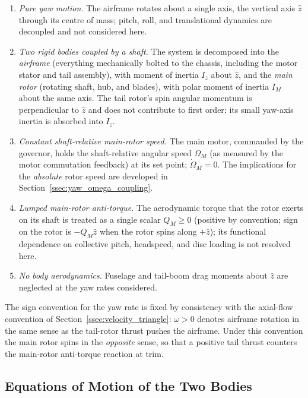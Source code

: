 \documentclass[11pt,a4paper]{article}
\begin{document}
\begin{enumerate}[leftmargin=*,itemsep=2pt,topsep=2pt]
\item \emph{Pure yaw motion.} The airframe rotates about a single
      axis, the vertical axis \(\hat z\) through its centre of mass;
      pitch, roll, and translational dynamics are decoupled and not
      considered here.
\item \emph{Two rigid bodies coupled by a shaft.} The system is
      decomposed into the \emph{airframe} (everything mechanically
      bolted to the chassis, including the motor stator and tail
      assembly), with moment of inertia \(I_z\) about \(\hat z\),
      and the \emph{main rotor} (rotating shaft, hub, and blades),
      with polar moment of inertia \(I_M\) about the same axis.
      The tail rotor's spin angular momentum is perpendicular to
      \(\hat z\) and does not contribute to first order; its small
      yaw-axis inertia is absorbed into \(I_z\).
\item \emph{Constant shaft-relative main-rotor speed.} The
      main motor, commanded by the governor, holds the
      shaft-relative angular speed \(\Omega_M\) (as measured by the
      motor commutation feedback) at its set point;
      \(\dot\Omega_M=0\). The implications for the \emph{absolute}
      rotor speed are developed in
      Section~\ref{ssec:yaw_omega_coupling}.
\item \emph{Lumped main-rotor anti-torque.} The aerodynamic torque
      that the rotor exerts on its shaft is treated as a single
      scalar \(Q_M\ge 0\) (positive by convention; sign on the rotor
      is \(-Q_M\hat z\) when the rotor spins along \(+\hat z\));
      its functional dependence on collective pitch, headspeed, and
      disc loading is not resolved here.
\item \emph{No body aerodynamics.} Fuselage and tail-boom drag
      moments about \(\hat z\) are neglected at the yaw rates
      considered.
\end{enumerate}

The sign convention for the yaw rate is fixed by consistency with the
axial-flow convention of Section~\ref{ssec:velocity_triangle}:
\(\omega>0\) denotes airframe rotation in the same sense as the
tail-rotor thrust pushes the airframe. Under this convention the
main rotor spins in the \emph{opposite} sense, so that a positive
tail thrust counters the main-rotor anti-torque reaction at trim.

\subsection{Equations of Motion of the Two Bodies}\label{ssec:yaw_newton}
\end{document}
